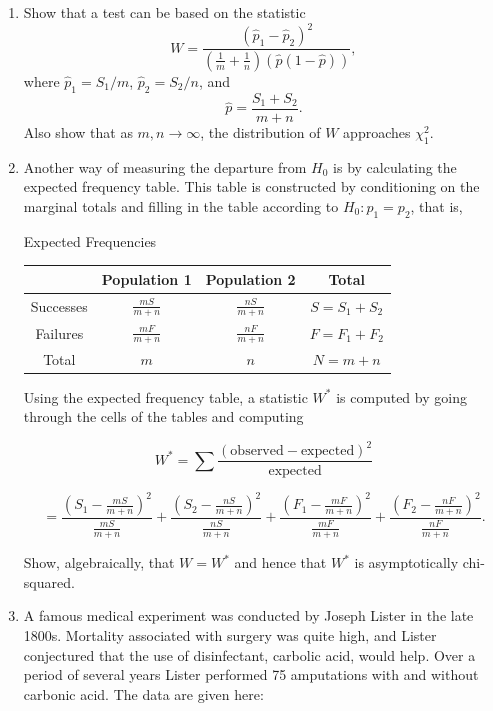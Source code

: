 \documentclass[letterpaper]{article}
\begin{document}
		\begin{enumerate}
			
			\item[i] Show that a test can be based on the statistic
			\[
			W = \frac{(\hat p_1 - \hat p_2)^2}{\left(\frac{1}{m} + \frac{1}{n}\right)\left(\hat p (1-\hat p)\right)},
			\]
			where $\hat p_1 = S_1/m$, $\hat p_2 = S_2/n$, and
			\[
			\hat p = \frac{S_1 + S_2}{m+n}.
			\]
			Also show that as $m,n \to \infty$, the distribution of $W$ approaches $\chi^2_1$.
			
			\item[ii] Another way of measuring the departure from $H_0$ is by calculating the expected frequency table. 
			This table is constructed by conditioning on the marginal totals and filling in the table according to $H_0: p_1=p_2$, that is,
			
			\medskip
			
			\begin{center}
				Expected Frequencies
				
				\begin{tabular}{c|c|c|c}
					& Population 1 & Population 2 & Total \\
					\hline
					Successes & $\frac{mS}{m+n}$ & $\frac{nS}{m+n}$ & $S = S_1 + S_2$ \\
					Failures & $\frac{mF}{m+n}$ & $\frac{nF}{m+n}$ & $F = F_1 + F_2$ \\
					\hline
					Total & $m$ & $n$ & $N = m+n$
				\end{tabular}
			\end{center}
			
			Using the expected frequency table, a statistic $W^*$ is computed by going through the cells of the tables and computing
			
			\[
			W^* =
			\sum \frac{(\text{observed} - \text{expected})^2}{\text{expected}}
			\]
			
			\[
			=
			\frac{\left(S_1 - \frac{mS}{m+n}\right)^2}{\frac{mS}{m+n}}
			+
			\frac{\left(S_2 - \frac{nS}{m+n}\right)^2}{\frac{nS}{m+n}}
			+
			\frac{\left(F_1 - \frac{mF}{m+n}\right)^2}{\frac{mF}{m+n}}
			+
			\frac{\left(F_2 - \frac{nF}{m+n}\right)^2}{\frac{nF}{m+n}}.
			\]
			
			Show, algebraically, that $W = W^*$ and hence that $W^*$ is asymptotically chi-squared.
			
			\item[iii] A famous medical experiment was conducted by Joseph Lister in the late 1800s. 
			Mortality associated with surgery was quite high, and Lister conjectured that the use of disinfectant, carbolic acid, would help. 
			Over a period of several years Lister performed 75 amputations with and without carbonic acid. 
			The data are given here:
			

\end{enumerate}
\end{document}
